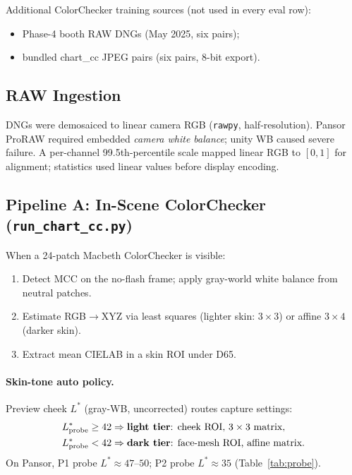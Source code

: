 \documentclass[11pt]{article}
\begin{document}
Additional ColorChecker training sources (not used in every eval row):
\begin{itemize}[noitemsep]
  \item Phase-4 booth RAW DNGs (May 2025, six pairs);
  \item bundled chart\_cc JPEG pairs (six pairs, 8-bit export).
\end{itemize}

\subsection{RAW Ingestion}

DNGs were demosaiced to linear camera RGB (\texttt{rawpy}, half-resolution).
Pansor ProRAW required embedded \emph{camera white balance}; unity WB caused severe failure.
A per-channel 99.5th-percentile scale mapped linear RGB to $[0,1]$ for alignment; statistics used linear values before display encoding.

\subsection{Pipeline A: In-Scene ColorChecker (\texttt{run\_chart\_cc.py})}

When a 24-patch Macbeth ColorChecker is visible:
\begin{enumerate}[noitemsep]
  \item Detect MCC on the no-flash frame; apply gray-world white balance from neutral patches.
  \item Estimate RGB$\rightarrow$XYZ via least squares (lighter skin: $3\times3$) or affine $3\times4$ (darker skin).
  \item Extract mean CIELAB in a skin ROI under D65.
\end{enumerate}

\paragraph{Skin-tone auto policy.}
Preview cheek $L^*$ (gray-WB, uncorrected) routes capture settings:
\begin{align*}
  L^*_{\mathrm{probe}} \ge 42 &\Rightarrow \text{\textbf{light tier}: cheek ROI, } 3\times3 \text{ matrix},\\
  L^*_{\mathrm{probe}} < 42 &\Rightarrow \text{\textbf{dark tier}: face-mesh ROI, affine matrix}.
\end{align*}
On Pansor, P1 probe $L^*\approx 47$--$50$; P2 probe $L^*\approx 35$ (Table~\ref{tab:probe}).
\end{document}
